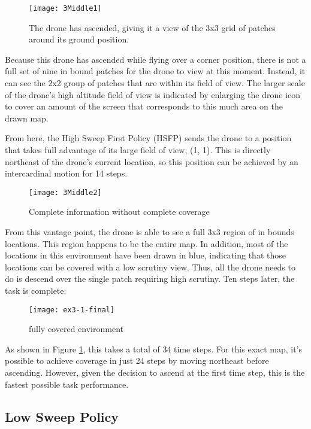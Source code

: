 \begin{figure}[H]
\texttt{[image: 3Middle1]}
\caption[Partially Explored Environment]{The drone has ascended, giving it a view of the 3x3 grid of patches around its ground position.}
\end{figure}

Because this drone has ascended while flying over a corner position, there is not a full set of nine in bound patches for the drone to view at this moment. Instead, it can see the 2x2 group of patches that are within its field of view. The larger scale of the drone's high altitude field of view is indicated by enlarging the drone icon to cover an amount of the screen that corresponds to this much area on the drawn map.

From here, the High Sweep First Policy (HSFP) sends the drone to a position that takes full advantage of its large field of view, (1, 1). This is directly northeast of the drone's current location, so this position can be achieved by an intercardinal motion for 14 steps.

\begin{figure}[H]
\texttt{[image: 3Middle2]}
\caption[Complete information without complete coverage]{Complete information without complete coverage}
\end{figure}

From this vantage point, the drone is able to see a full 3x3 region of in bounds locations. This region happens to be the entire map. In addition, most of the locations in this environment have been drawn in blue, indicating that those locations can be covered with a low scrutiny view. Thus, all the drone needs to do is descend over the single patch requiring high scrutiny. Ten steps later, the task is complete:

\begin{figure}[H]
\texttt{[image: ex3-1-final]}
\caption[Fully Covered Envrionment]{fully covered environment}
\label{fig:3-1-end}
\end{figure}

As shown in Figure \ref{fig:3-1-end}, this takes a total of 34 time steps. For this exact map, it's possible to achieve coverage in just 24 steps by moving northeast before ascending. However, given the decision to ascend at the first time step, this is the fastest possible task performance.

\subsection{Low Sweep Policy}

